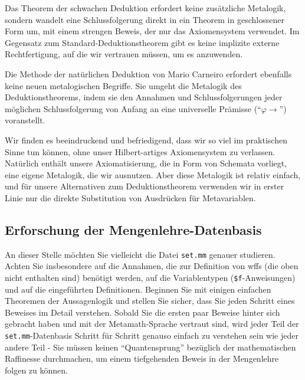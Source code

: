 Das Theorem der schwachen Deduktion erfordert keine zusätzliche Metalogik, sondern wandelt eine Schlussfolgerung direkt in ein Theorem in geschlossener Form um, mit einem strengen Beweis, der nur das Axiomensystem verwendet. Im Gegensatz zum Standard-Deduktionstheorem gibt es keine implizite externe Rechtfertigung, auf die wir vertrauen müssen, um es anzuwenden.

Die Methode der natürlichen Deduktion von Mario Carneiro erfordert ebenfalls keine neuen metalogischen Begriffe. Sie umgeht die Metalogik des Deduktionstheorems, indem sie den Annahmen und Schlussfolgerungen jeder möglichen Schlussfolgerung von Anfang an eine universelle Prämisse ("`$\varphi \rightarrow$"') voranstellt.

Wir finden es beeindruckend und befriedigend, dass wir so viel im praktischen Sinne tun können, ohne unser Hilbert-artiges Axiomensystem zu verlassen. Natürlich enthält unsere Axiomatisierung, die in Form von Schemata vorliegt, eine eigene Metalogik, die wir ausnutzen. Aber diese Metalogik ist relativ einfach, und für unsere Alternativen zum Deduktionstheorem verwenden wir in erster Linie nur die direkte Substitution von Ausdrücken für Metavariablen.

\begin{sloppy}
\section{Erforschung der Mengenlehre-Datenbasis}\label{exploring}
\end{sloppy}

An dieser Stelle möchten Sie vielleicht die Datei \texttt{set.mm} genauer studieren.  Achten Sie insbesondere auf die Annahmen, die zur Definition von wffs (die oben nicht enthalten sind) benötigt werden, auf die Variablentypen (\texttt{\$f}-Anweisungen) und auf die eingeführten Definitionen.  Beginnen Sie mit einigen einfachen Theoremen der Aussagenlogik und stellen Sie sicher, dass Sie jeden Schritt eines Beweises im Detail verstehen.  Sobald Sie die ersten paar Beweise hinter sich gebracht haben und mit der Metamath-Sprache vertraut sind, wird jeder Teil der \texttt{set.mm}-Datenbasis Schritt für Schritt genauso einfach zu verstehen sein wie jeder andere Teil - Sie müssen keinen "`Quantensprung"' bezüglich der mathematischen Raffinesse durchmachen, um einem tiefgehenden Beweis in der Mengenlehre folgen zu können.

